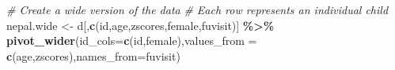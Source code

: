 \documentclass[
]{article}
\newenvironment{Shaded}{\begin{snugshade}}{\end{snugshade}}
\newcommand{\AttributeTok}[1]{\textcolor[rgb]{0.13,0.29,0.53}{#1}}
\newcommand{\CommentTok}[1]{\textcolor[rgb]{0.56,0.35,0.01}{\textit{#1}}}
\newcommand{\FunctionTok}[1]{\textcolor[rgb]{0.13,0.29,0.53}{\textbf{#1}}}
\newcommand{\NormalTok}[1]{#1}
\newcommand{\OtherTok}[1]{\textcolor[rgb]{0.56,0.35,0.01}{#1}}
\newcommand{\SpecialCharTok}[1]{\textcolor[rgb]{0.81,0.36,0.00}{\textbf{#1}}}
\newcommand{\StringTok}[1]{\textcolor[rgb]{0.31,0.60,0.02}{#1}}
\begin{document}
\begin{Shaded}
\begin{Highlighting}[]
\CommentTok{\# Create a wide version of the data}
\CommentTok{\# Each row represents an individual child}
\NormalTok{nepal.wide }\OtherTok{\textless{}{-}}\NormalTok{ d[,}\FunctionTok{c}\NormalTok{(}\StringTok{\textquotesingle{}id\textquotesingle{}}\NormalTok{,}\StringTok{\textquotesingle{}age\textquotesingle{}}\NormalTok{,}\StringTok{\textquotesingle{}zscores\textquotesingle{}}\NormalTok{,}\StringTok{\textquotesingle{}female\textquotesingle{}}\NormalTok{,}\StringTok{\textquotesingle{}fuvisit\textquotesingle{}}\NormalTok{)] }\SpecialCharTok{\%\textgreater{}\%} \FunctionTok{pivot\_wider}\NormalTok{(}\AttributeTok{id\_cols=}\FunctionTok{c}\NormalTok{(id,female),}\AttributeTok{values\_from =} \FunctionTok{c}\NormalTok{(age,zscores),}\AttributeTok{names\_from=}\StringTok{\textquotesingle{}fuvisit\textquotesingle{}}\NormalTok{)}


\end{Highlighting}
\end{Shaded}
\end{document}
